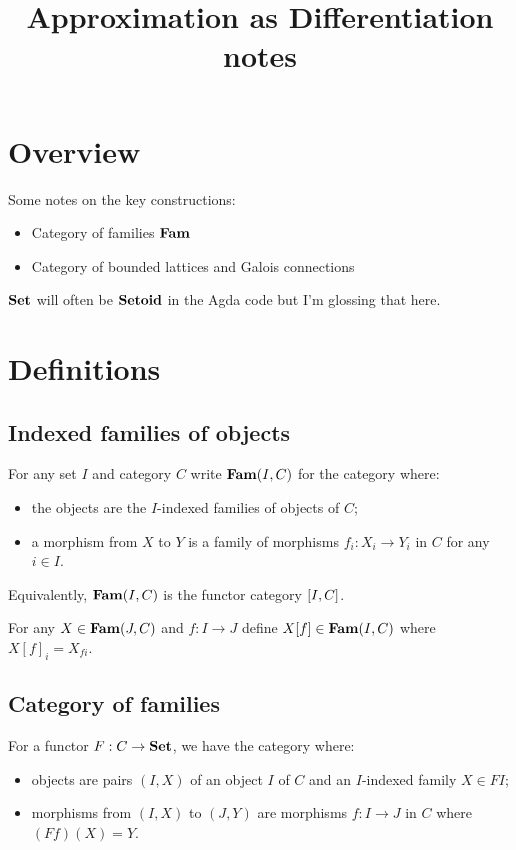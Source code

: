 \documentclass[nonacm]{acmart}
\begin{document}
\title{Approximation as Differentiation notes}
\maketitle

\section{Overview}

Some notes on the key constructions:
\begin{itemize}
\item Category of families $\mathbf{Fam}$
\item Category of bounded lattices and Galois connections
\end{itemize}

\noindent $\mathbf{Set}$ will often be $\mathbf{Setoid}$ in the Agda code but I'm glossing that here.

\section{Definitions}

\subsection{Indexed families of objects}

For any set $I$ and category $C$ write $\mathbf{Fam}(I,C)$ for the category where:
\begin{itemize}
\item the objects are the $I$-indexed families of objects of $C$;
\item a morphism from $X$ to $Y$ is a family of morphisms $f_i: X_i \to Y_i$ in $C$ for any $i \in I$.
\end{itemize}

\noindent Equivalently, $\mathbf{Fam}(I,C)$ is the functor category $[I,C]$.

\begin{definition}
For any $X \in \mathbf{Fam}(J,C)$ and $f: I \to J$ define $X[f] \in \mathbf{Fam}(I,C)$ where $X[f]_i = X_{fi}$.
\end{definition}

\subsection{Category of families}

For a functor $F: C \to \mathbf{Set}$, we have the category where:
\begin{itemize}
\item objects are pairs $(I, X)$ of an object $I$ of $C$ and an $I$-indexed family $X \in FI$;
\item morphisms from $(I, X)$ to $(J, Y)$ are morphisms $f: I \to J$ in $C$ where $(Ff)(X) = Y$.
\end{itemize}
\end{document}
